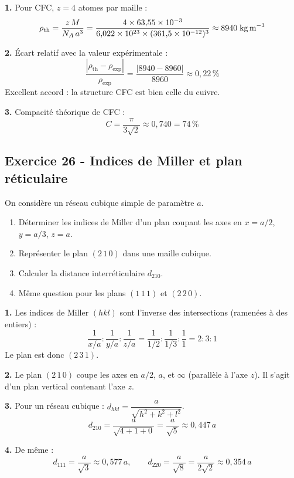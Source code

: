 \documentclass[12pt,a4paper]{article}
\begin{document}
\begin{boitecorrige}
\textbf{1.} Pour CFC, $z = 4$ atomes par maille :
\[
\rho_\text{th} = \frac{z\,M}{N_A\,a^3} = \frac{4\times 63{,}55\times 10^{-3}}{6{,}022\times 10^{23}\times (361{,}5\times 10^{-12})^3} \approx 8940\;\text{kg\,m}^{-3}
\]

\textbf{2.} Écart relatif avec la valeur expérimentale :
\[
\frac{|\rho_\text{th}-\rho_\text{exp}|}{\rho_\text{exp}} = \frac{|8940-8960|}{8960} \approx 0{,}22\,\%
\]
Excellent accord : la structure CFC est bien celle du cuivre.

\textbf{3.} Compacité théorique de CFC :
\[
C = \frac{\pi}{3\sqrt{2}} \approx 0{,}740 = 74\,\%
\]
\end{boitecorrige}

\subsection*{Exercice 26 - Indices de Miller et plan réticulaire \niveau{\facile}}

\begin{boiteexercice}
On considère un réseau cubique simple de paramètre $a$.
\begin{enumerate}
  \item Déterminer les indices de Miller d'un plan coupant les axes en $x = a/2$, $y = a/3$, $z = a$.
  \item Représenter le plan $(2\,1\,0)$ dans une maille cubique.
  \item Calculer la distance interréticulaire $d_{210}$.
  \item Même question pour les plans $(1\,1\,1)$ et $(2\,2\,0)$.
\end{enumerate}
\end{boiteexercice}

\begin{boitecorrige}
\textbf{1.} Les indices de Miller $(hkl)$ sont l'inverse des intersections (ramenées à des entiers) :
\[
\frac{1}{x/a} : \frac{1}{y/a} : \frac{1}{z/a} = \frac{1}{1/2} : \frac{1}{1/3} : \frac{1}{1} = 2 : 3 : 1
\]
Le plan est donc $(2\,3\,1)$.

\textbf{2.} Le plan $(2\,1\,0)$ coupe les axes en $a/2$, $a$, et $\infty$ (parallèle à l'axe $z$). Il s'agit d'un plan vertical contenant l'axe $z$.

\textbf{3.} Pour un réseau cubique : $d_{hkl} = \dfrac{a}{\sqrt{h^2+k^2+l^2}}$.
\[
d_{210} = \frac{a}{\sqrt{4+1+0}} = \frac{a}{\sqrt{5}} \approx 0{,}447\,a
\]

\textbf{4.} De même :
\[
d_{111} = \frac{a}{\sqrt{3}} \approx 0{,}577\,a, \qquad d_{220} = \frac{a}{\sqrt{8}} = \frac{a}{2\sqrt{2}} \approx 0{,}354\,a
\]
\end{boitecorrige}
\end{document}
